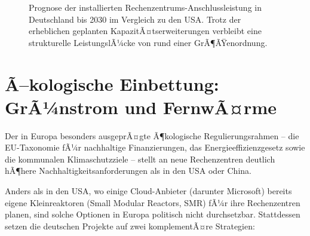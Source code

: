 ﻿\documentclass[12pt, a4paper, openany]{report}
\begin{document}
\begin{figure}[H]
	\centering
	\caption{Prognose der installierten Rechenzentrums-Anschlussleistung
		in Deutschland bis 2030 im Vergleich zu den USA. Trotz der erheblichen
		geplanten KapazitÃ¤tserweiterungen verbleibt eine strukturelle
		LeistungslÃ¼cke von rund einer GrÃ¶ÃŸenordnung.}
	\label{fig:rz_prognose_de}
\end{figure}

\section{Ã–kologische Einbettung: GrÃ¼nstrom und FernwÃ¤rme}
\label{sec:oekologie}

Der in Europa besonders ausgeprÃ¤gte Ã¶kologische Regulierungsrahmen -- die
EU-Taxonomie fÃ¼r nachhaltige Finanzierungen, das Energieeffizienzgesetz sowie
die kommunalen Klimaschutzziele -- stellt an neue Rechenzentren deutlich
hÃ¶here Nachhaltigkeitsanforderungen als in den USA oder China.

Anders als in den USA, wo einige Cloud-Anbieter (darunter Microsoft) bereits
eigene Kleinreaktoren (Small Modular Reactors, SMR) fÃ¼r ihre
Rechenzentren planen, sind solche Optionen in Europa politisch nicht
durchsetzbar. Stattdessen setzen die deutschen Projekte auf zwei
komplementÃ¤re Strategien:
\end{document}
